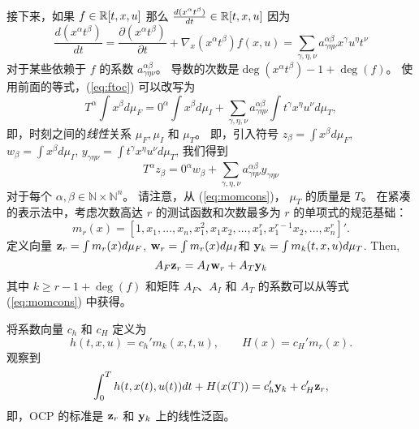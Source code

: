 \begin{translation}
接下来，如果 $f\in\mathbb{R}[t,x,u]$ 那么 $\frac{d(x^\alpha t^\beta)}{dt}\in\mathbb{R}[t,x,u]$ 因为
\begin{equation}\nonumber %
\frac{d(x^\alpha t^\beta)}{dt} \! = \! \frac{\partial(x^\alpha t^\beta)}{\partial t} + \nabla_x (x^\alpha t^\beta)f(x,u) \! = \!\! \sum_{\gamma,\eta,\nu} \! a^{\alpha\beta}_{\gamma\eta\nu} x^\gamma u^\eta t^\nu
\end{equation}
对于某些依赖于 $f$ 的系数 $a^{\alpha\beta}_{\gamma\eta\nu}$。
导数的次数是$\deg(x^\alpha t^\beta)-1+\deg(f)$。
使用前面的等式，(\ref{eq:ftoc}) 可以改写为
\begin{equation}\label{eq:meascons}
T^\alpha \int x^\beta d\mu_F 
= 0^\alpha \int x^\beta d\mu_I + \sum_{\gamma,\eta,\nu} a^{\alpha\beta}_{\gamma\eta\nu} \int t^\gamma x^\eta u^\nu d\mu_T,
\end{equation}
即，时刻之间的{\it 线性}关系
$\mu_F, \mu_I$ 和 $\mu_T$。
即，引入符号 
$z_{\beta}=\int x^\beta d\mu_F$,
$w_{\beta}=\int x^\beta d\mu_I$,
$y_{\gamma\eta\nu}=\int t^\gamma x^\eta u^\nu d\mu_T$, 
我们得到
\begin{equation}\label{eq:momcons}
T^\alpha z_{\beta} = 0^\alpha w_{\beta} + \sum_{\gamma,\eta,\nu} a^{\alpha\beta}_{\gamma\eta\nu} y_{\gamma\eta\nu}
\end{equation}
对于每个 $\alpha,\beta\in\mathbb{N}\times\mathbb{N}^{n}$。 请注意，从 (\ref{eq:momcons})，
$\mu_T$ 的质量是 $T$。
在紧凑的表示法中，考虑次数高达 $r$ 的测试函数和次数最多为 $r$ 的单项式的规范基础：
\begin{equation}\nonumber
m_r(x)=[1,x_1,\dots,x_n,x_1^2,x_1x_2,\dots,x_1^r,x_1^{r-1}x_2,\dots,x_n^r]'.
\end{equation}
定义向量
$\mathbf{z}_r=\int m_r(x) d\mu_F$,
$\mathbf{w}_r=\int m_r(x) d\mu_I$和
$\mathbf{y}_k=\int m_k(t,x,u) d\mu_T$.
Then,
\begin{equation}\label{eq:momcon}
A_F \mathbf{z}_r = A_I \mathbf{w}_r + A_T \mathbf{y}_k
\end{equation}
其中 $k\geq r-1+\deg(f)$ 和矩阵 $A_F$、$A_I$ 和 $A_T$ 的系数可以从等式 (\ref{eq:momcons}) 中获得。

将系数向量 $c_h$ 和 $c_H$ 定义为
\begin{equation}\nonumber
h(t,x,u)=c_h'm_k(x,t,u), \qquad H(x)=c_H' m_r(x).
\end{equation}
观察到
\begin{equation}\label{criterion}
\int_0^T h(t, x(t), u(t)) dt + H(x(T))=c_h' \mathbf{y}_k+  c_H' \mathbf{z}_r,
\end{equation}
即，OCP 的标准是 $\mathbf{z}_r$ 和 $\mathbf{y}_k$ 上的线性泛函。


\end{translation}
